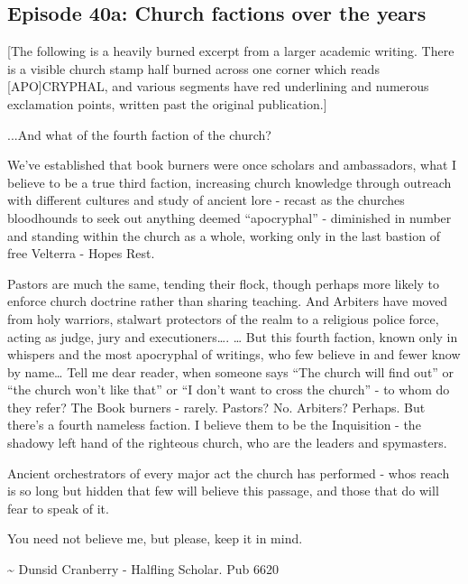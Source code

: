 \subsection{Episode 40a: Church factions over the years}

[The following is a heavily burned excerpt from a larger academic writing. There is a visible church stamp half burned across one corner which reads [APO]CRYPHAL, and various segments have red underlining and numerous exclamation points, written past the original publication.]\medskip

...And what of the fourth faction of the church?\medskip

We’ve established that book burners were once scholars and ambassadors, what I believe to be a true third faction, increasing church knowledge through outreach with different cultures and study of ancient lore - recast as the churches bloodhounds to seek out anything deemed “apocryphal” - diminished in number and standing within the church as a whole, working only in the last bastion of free Velterra - Hopes Rest.\medskip

Pastors are much the same, tending their flock, though perhaps more likely to enforce church doctrine rather than sharing teaching. And Arbiters have moved from holy warriors, stalwart protectors of the realm to a religious police force, acting as judge, jury and executioners…. … But this fourth faction, known only in whispers and the most apocryphal of writings, who few believe in and fewer know by name… Tell me dear reader, when someone says “The church will find out” or “the church won’t like that” or “I don’t want to cross the church” - to whom do they refer? The Book burners - rarely. Pastors? No. Arbiters? Perhaps. But there’s a fourth nameless faction. I believe them to be the Inquisition - the shadowy left hand of the righteous church, who are the leaders and spymasters.\medskip

Ancient orchestrators of every major act the church has performed - whos reach is so long but hidden that few will believe this passage, and those that do will fear to speak of it.\medskip

You need not believe me, but please, keep it in mind.\medskip

\textasciitilde{} Dunsid Cranberry - Halfling Scholar. Pub 6620\medskip

\vspace*{5mm}

